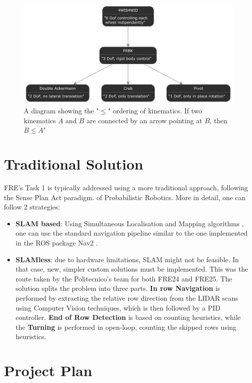 \documentclass[11pt,a4paper,twocolumn]{article}
\begin{document}
\begin{figure}
    \centering
    \includegraphics[width=1\linewidth]{Multidisciplinary_Project_Report/Images/poset.png}
    \caption{A diagram showing the "$\leq$" ordering of kinematics. If two kinematics $A$ and $B$ are connected by an arrow pointing at $B$, then $B \leq A$"}
    \label{fig:poset}
\end{figure}

\section{Traditional Solution}
FRE's Task 1 is typically addressed using a more traditional approach, following the Sense Plan Act paradigm. of Probabilistic Robotics. More in detail, one can follow 2 strategies:
\begin{itemize}
    \item \textbf{SLAM based}: Using Simultaneous Localisation and Mapping algorithms \cite{DurrantWhyte2006SimultaneousLA} \cite{ProbabilisticRobotics}, one can use the standard navigation pipeline similar to the one implemented in the ROS package Nav2 \cite{nav2}.
    \item \textbf{SLAMless}: due to hardware limitations, SLAM might not be feasible. In that case, new, simpler custom solutions must be implemented. This was the route taken by the Politecnico's team for both FRE24 and FRE25. The solution splits the problem into three parts. \textbf{In row Navigation} is performed by extracting the relative row direction from the LIDAR scans using Computer Vision techniques, which is then followed by a PID controller. \textbf{End of Row Detection} is based on counting heuristics, while the \textbf{Turning} is performed in open-loop, counting the skipped rows using heuristics. 
\end{itemize}

\section{Project Plan}
\end{document}
